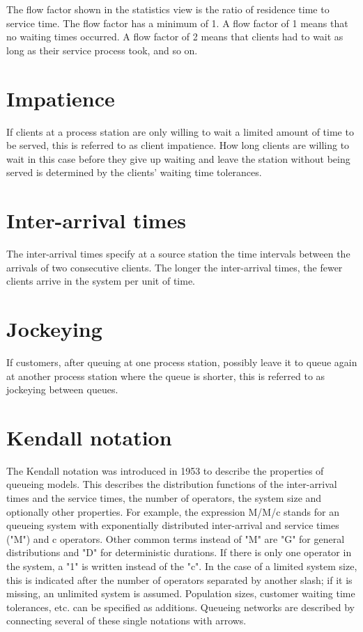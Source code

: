 The flow factor shown in the statistics view is the ratio of residence time to service time.
The flow factor has a minimum of 1. A flow factor of 1 means that no waiting times occurred. A flow factor of 2 means that
clients had to wait as long as their service process took, and so on.

\section*{Impatience}


If clients at a process station are only willing to wait
a limited amount of time to be served, this is referred to as client impatience.
How long clients are willing to wait in this case before they give up waiting and leave the
station without being served is determined by the clients' waiting time tolerances.

\section*{Inter-arrival times}


The inter-arrival times specify at a source station the time intervals between
the arrivals of two consecutive clients. The longer the inter-arrival times, the fewer clients arrive in the system per unit of time.

\section*{Jockeying}


If customers, after queuing at one process station, possibly leave it to queue again at another
process station where the queue is shorter, this is referred to as jockeying between queues.

\section*{Kendall notation}


The Kendall notation was introduced in 1953 to describe the properties of queueing models.
This describes the distribution functions of the inter-arrival times and the service times,
the number of operators, the system size and optionally other properties. For example,
the expression M/M/c stands for an queueing system with exponentially distributed inter-arrival
and service times ("M") and c operators. Other common terms instead of "M" are "G" for
general distributions and "D" for deterministic durations. If there is only one operator in the system,
a "1" is written instead of the "c". In the case of a limited system size, this is indicated after
the number of operators separated by another slash; if it is missing, an unlimited system is assumed.
Population sizes, customer waiting time tolerances, etc. can be specified as additions.
Queueing networks are described by connecting several of these single notations with arrows.


